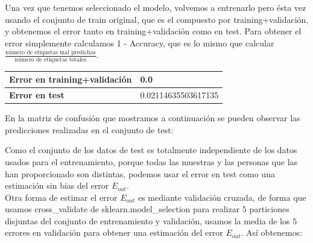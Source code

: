 \documentclass[12pt]{article}
\begin{document}
Una vez que tenemos seleccionado el modelo, volvemos a entrenarlo pero ésta vez usando el conjunto de train original, que es el compuesto por training+validación, y obtenemos el error tanto en training+validación como en test. 
Para obtener el error simplemente calculamos 1 - Accuracy, que es lo mismo que calcular $\frac{\text{número de etiquetas mal predichas}}{\text{número de etiquetas totales}}$.

\begin{table}[H]
\centering
\begin{tabular}{|l|l|}
\hline
\textbf{Error en training+validación}   & 0.0  \\ \hline
\textbf{Error en test} & 0.02114635503617135 \\ \hline
\end{tabular}
\end{table}

En la matriz de confusión que mostramos a continuación se pueden observar las predicciones realizadas en el conjunto de test:

\begin{figure}[H]
\centering
\end{figure}



Como el conjunto de los datos de test es totalmente independiente de los datos usados para el entrenamiento, porque todas las muestras y las personas que las han proporcionado son distintas, podemos usar el error en test como una estimación sin bias del error $E_{out}$.\\

Otra forma de estimar el error $E_{out}$ es mediante validación cruzada, de forma que usamos cross\_validate de sklearn.model\_selection para realizar $5$ particiones disjuntas del conjunto de entrenamiento y validación, usamos la media de los $5$ errores en validación para obtener una estimación del error $E_{out}$. Así obtenemos:
\end{document}
